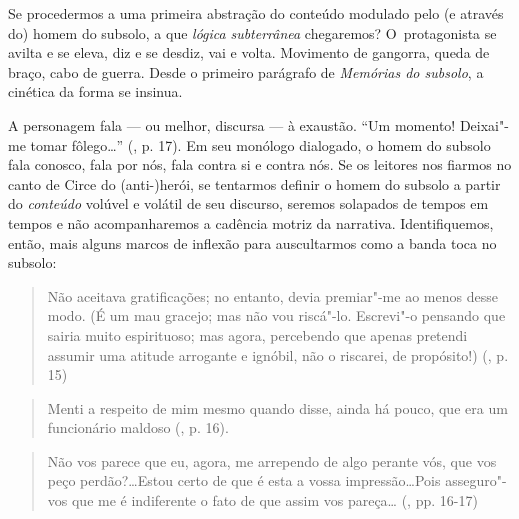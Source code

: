 Se procedermos a uma primeira abstração do conteúdo modulado pelo (e
através do) homem do subsolo, a que \emph{lógica} \emph{subterrânea}
chegaremos? O~protagonista se avilta e se eleva, diz e se desdiz, vai e
volta. Movimento de gangorra, queda de braço, cabo de guerra. Desde o
primeiro parágrafo de \emph{Memórias do subsolo}, a cinética da forma se
insinua.

A personagem fala --- ou melhor, discursa --- à exaustão. ``Um momento!
Deixai"-me tomar fôlego\ldots'' (, p. 17). Em seu monólogo dialogado, o
homem do subsolo fala conosco, fala por nós, fala contra si e contra
nós. Se os leitores nos fiarmos no canto de Circe do \mbox{(anti-)herói}, se
tentarmos definir o homem do subsolo a partir do \emph{conteúdo} volúvel
e volátil de seu discurso, seremos solapados de tempos em tempos e não
acompanharemos a cadência motriz da narrativa. Identifiquemos, então,
mais alguns marcos de inflexão para auscultarmos como a banda toca no
subsolo:

\begin {quote}
Não aceitava gratificações; no entanto, devia premiar"-me ao menos desse
modo. (É um mau gracejo; mas não vou riscá"-lo. Escrevi"-o pensando que
sairia muito espirituoso; mas agora, percebendo que apenas pretendi
assumir uma atitude arrogante e ignóbil, não o riscarei, de propósito!)
(, p. 15)
\end{quote}

\begin{quote}
Menti a respeito de mim mesmo quando disse, ainda há pouco, que era um
funcionário maldoso (, p. 16).
\end{quote}

\begin{quote}
Não vos parece que eu, agora, me arrependo de algo perante vós, que vos
peço perdão?\ldots Estou certo de que é esta a vossa impressão\ldots Pois
asseguro"-vos que me é indiferente o fato de que assim vos pareça\ldots
(, pp. 16-17)
\end{quote}

